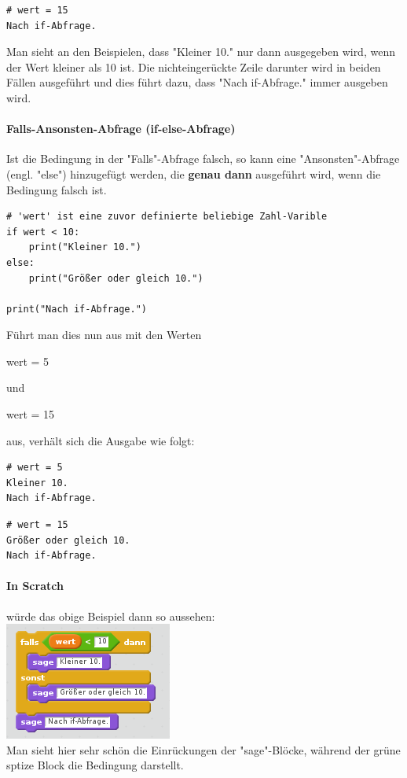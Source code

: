 \documentclass[12pt,a4paper,oneside,ngerman]{scrbook}
\newcommand{\code}[1]{
	\begin{ttfamily}#1\end{ttfamily}
}
\begin{document}
\begin{lstlisting}[style=Output, caption=Beispiel Ausgabe für größeren Wert]
# wert = 15
Nach if-Abfrage.
\end{lstlisting}

Man sieht an den Beispielen, dass "Kleiner 10." nur dann ausgegeben wird, wenn der Wert kleiner als 10 ist. Die nichteingerückte Zeile darunter wird in beiden Fällen ausgeführt und dies führt dazu, dass "Nach if-Abfrage." immer ausgeben wird.


\paragraph{Falls-Ansonsten-Abfrage (if-else-Abfrage)} Ist die Bedingung in der "Falls"-Abfrage falsch, so kann eine "Ansonsten"-Abfrage (engl. "else") hinzugefügt werden, die \textbf{genau dann} ausgeführt wird, wenn die Bedingung falsch ist.

\begin{lstlisting}[style=Python, caption='Kleiner'-Vergleich mit if-else-Abfrage]
# 'wert' ist eine zuvor definierte beliebige Zahl-Varible
if wert < 10:
	print("Kleiner 10.")
else:
	print("Größer oder gleich 10.")

print("Nach if-Abfrage.")
\end{lstlisting}
Führt man dies nun aus mit den Werten \code{wert = 5} und \code{wert = 15} aus, verhält sich die Ausgabe wie folgt:
\begin{lstlisting}[style=Output, caption=Ausgabe für kleineren Wert]
# wert = 5
Kleiner 10.
Nach if-Abfrage.
\end{lstlisting}

\begin{lstlisting}[style=Output, caption=Beispiel Ausgabe für größeren Wert]
# wert = 15
Größer oder gleich 10.
Nach if-Abfrage.
\end{lstlisting}

\paragraph{In Scratch} würde das obige Beispiel dann so aussehen:
\\
\includegraphics[scale=1]{scratch_if_else}
\\
Man sieht hier sehr schön die Einrückungen der "sage"-Blöcke, während der grüne sptize Block die Bedingung darstellt.
\end{document}
